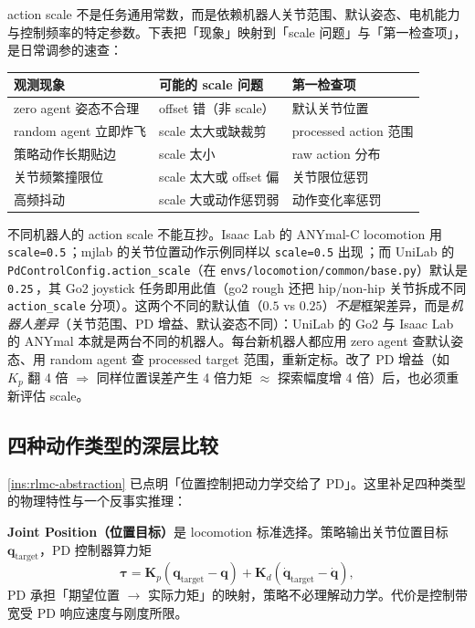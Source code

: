 action scale 不是任务通用常数，而是依赖机器人关节范围、默认姿态、电机能力与控制频率的特定参数。下表把「现象」映射到「scale 问题」与「第一检查项」，是日常调参的速查：

\begin{center}
\small
\begin{tabular}{@{}lll@{}}
\toprule
观测现象 & 可能的 scale 问题 & 第一检查项 \\
\midrule
zero agent 姿态不合理 & offset 错（非 scale） & 默认关节位置 \\
random agent 立即炸飞 & scale 太大或缺裁剪 & processed action 范围 \\
策略动作长期贴边 & scale 太小 & raw action 分布 \\
关节频繁撞限位 & scale 太大或 offset 偏 & 关节限位惩罚 \\
高频抖动 & scale 大或动作惩罚弱 & 动作变化率惩罚 \\
\bottomrule
\end{tabular}
\end{center}

\begin{pitfall}
不同机器人的 action scale 不能互抄。Isaac Lab 的 ANYmal-C locomotion 用 \verb|scale=0.5|\,\cite{isaaclab2024}；mjlab 的关节位置动作示例同样以 \verb|scale=0.5| 出现\,\cite{mjlab2026}；而 UniLab 的 \verb|PdControlConfig.action_scale|（在 \verb|envs/locomotion/common/base.py|）默认是 \verb|0.25|\,\cite{unilab2026}，其 Go2 joystick 任务即用此值（go2 rough 还把 hip/non-hip 关节拆成不同 \verb|action_scale| 分项）。这两个不同的默认值（$0.5$ vs $0.25$）\emph{不是}框架差异，而是\emph{机器人差异}（关节范围、PD 增益、默认姿态不同）：UniLab 的 Go2 与 Isaac Lab 的 ANYmal 本就是两台不同的机器人。每台新机器人都应用 zero agent 查默认姿态、用 random agent 查 processed target 范围，重新定标。改了 PD 增益（如 $K_p$ 翻 4 倍 $\Rightarrow$ 同样位置误差产生 4 倍力矩 $\approx$ 探索幅度增 4 倍）后，也必须重新评估 scale。
\end{pitfall}

\subsection{四种动作类型的深层比较}
\label{sec:rlmc-action-deep}

\cref{ins:rlmc-abstraction} 已点明「位置控制把动力学交给了 PD」。这里补足四种类型的物理特性与一个反事实推理：

\textbf{Joint Position（位置目标）}是 locomotion 标准选择。策略输出关节位置目标 $\mathbf q_{\text{target}}$，PD 控制器算力矩
\begin{equation}
\boldsymbol\tau = \mathbf K_p(\mathbf q_{\text{target}}-\mathbf q) + \mathbf K_d(\dot{\mathbf q}_{\text{target}}-\dot{\mathbf q}),
\label{eq:rlmc-pd}
\end{equation}
PD 承担「期望位置 $\to$ 实际力矩」的映射，策略不必理解动力学。代价是控制带宽受 PD 响应速度与刚度所限。

